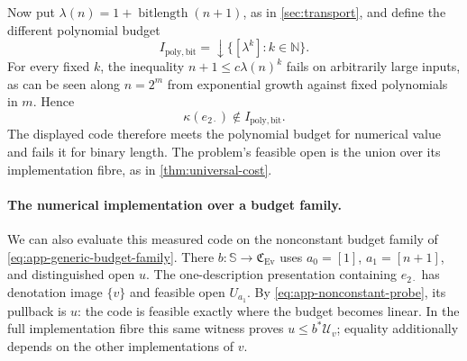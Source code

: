 \documentclass[11pt,a4paper]{article}
\numberwithin{algorithm}{section}
\numberwithin{equation}{section}
\theoremstyle{definition}
\theoremstyle{remark}
\theoremstyle{plain}
\newcommand{\N}{\mathbb N}
\newcommand{\Ev}{{\operatorname{Ev}}}
\newcommand{\Cplx}{\mathfrak C_{\Ev}}
\theoremstyle{definition}
\theoremstyle{plain}
\begin{document}
Now put $\lambda(n)=1+\operatorname{bitlength}(n+1)$, as in
\cref{sec:transport}, and define the different polynomial budget
\[
 I_{\mathrm{poly,bit}}
     =\downarrow\{[\lambda^k]:k\in\N\}.
\]
For every fixed $k$, the inequality
$n+1\le c\lambda(n)^k$ fails on arbitrarily large inputs, as can
be seen along $n=2^m$ from exponential growth against fixed
polynomials in $m$.  Hence
\[
 \kappa(e_{2\cdot})\notin I_{\mathrm{poly,bit}}.
\]
The displayed code therefore meets the polynomial budget for numerical
value and fails it for binary length. The problem's feasible open is
the union over its implementation fibre, as in
\cref{thm:universal-cost}.


\paragraph{The numerical implementation over a budget family.}
We can also evaluate this measured code on the nonconstant budget
family of \eqref{eq:app-generic-budget-family}.
There $b:\mathbb S\to\Cplx$ uses $a_0=[1]$, $a_1=[n+1]$,
and distinguished open $u$.
The one-description presentation containing $e_{2\cdot}$ has
denotation image $\{v\}$ and feasible open $U_{a_1}$.
By \eqref{eq:app-nonconstant-probe}, its pullback is $u$:
the code is feasible exactly where the budget becomes linear.
In the full implementation fibre this same witness proves
$u\le b^*\mathcal U_v$; equality additionally depends on the
other implementations of $v$.
\end{document}
